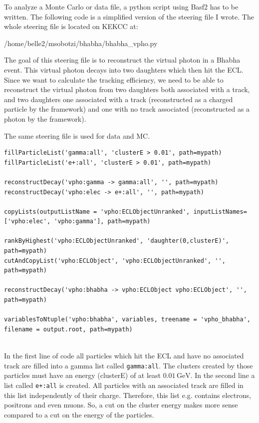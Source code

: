 \documentclass[a4paper,11pt,twosided,final,german,openbib,pdftex,listof=totoc,bibliography=totoc]{scrbook}
\begin{document}
To analyze a Monte Carlo or data file, a python script using Basf2 has to be written. The following code is a simplified version of the steering file I wrote. 
The whole steering file is located on KEKCC at:


/home/belle2/msobotzi/bhabha/bhabha\_vpho.py
\newline


The goal of this steering file is to reconstruct the virtual photon in a Bhabha event. This virtual photon decays into two daughters which then hit the ECL. Since we want to calculate the tracking efficiency, we need to be able to reconstruct the virtual photon from two daughters both associated with a track, and two daughters one associated with a track (reconstructed as a charged particle by the framework) and one with no track associated (reconstructed as a photon by the framework).

The same steering file is used for data and MC.
\newline 


{
\begin{lstlisting}
fillParticleList('gamma:all', 'clusterE > 0.01', path=mypath)
fillParticleList('e+:all', 'clusterE > 0.01', path=mypath)

reconstructDecay('vpho:gamma -> gamma:all', '', path=mypath)
reconstructDecay('vpho:elec -> e+:all', '', path=mypath)

copyLists(outputListName = 'vpho:ECLObjectUnranked', inputListNames=['vpho:elec', 'vpho:gamma'], path=mypath)

rankByHighest('vpho:ECLObjectUnranked', 'daughter(0,clusterE)', path=mypath)
cutAndCopyList('vpho:ECLObject', 'vpho:ECLObjectUnranked', '', path=mypath)
	
reconstructDecay('vpho:bhabha -> vpho:ECLObject vpho:ECLObject', '', path=mypath)

variablesToNtuple('vpho:bhabha', variables, treename = 'vpho_bhabha', filename = output.root, path=mypath)
	
\end{lstlisting}
}
\bigskip


In the first line of code all particles which hit the ECL and have no associated track are filled into a gamma list called \texttt{gamma:all}. The clusters created by those particles must have an energy (clusterE) of at least $0.01\,\textrm{GeV}$. In the second line a list called \texttt{e+:all} is created. All particles with an associated track are filled in this list independently of their charge. Therefore, this list e.g. contains electrons, positrons and even muons. So, a cut on the cluster energy makes more sense compared to a cut on the energy of the particles.
\end{document}
